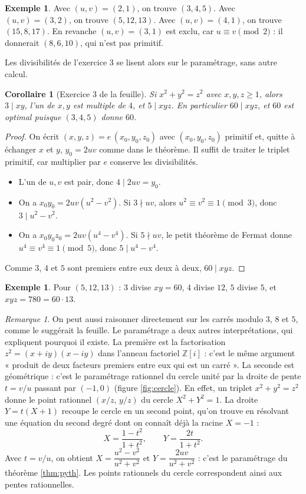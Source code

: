 \documentclass[11pt,a4paper]{article}
\theoremstyle{plain}
\newtheorem{corollaire}[theoreme]{Corollaire}
\theoremstyle{definition}
\newtheorem{exemple}[theoreme]{Exemple}
\theoremstyle{remark}
\newtheorem{remarque}[theoreme]{Remarque}
\newcommand{\Z}{\mathbb{Z}}
\begin{document}
\begin{exemple}
Avec $(u,v)=(2,1)$, on trouve $(3,4,5)$. Avec $(u,v)=(3,2)$, on trouve $(5,12,13)$. Avec $(u,v)=(4,1)$, on trouve $(15,8,17)$. En revanche $(u,v)=(3,1)$ est exclu, car $u\equiv v\pmod 2$ : il donnerait $(8,6,10)$, qui n'est pas primitif.
\end{exemple}

Les divisibilités de l'exercice 3 se lisent alors sur le paramétrage, sans autre calcul.

\begin{corollaire}[Exercice 3 de la feuille]\label{cor:60}
Si $x^2+y^2=z^2$ avec $x,y,z\geq1$, alors $3\mid xy$, l'un de $x,y$ est multiple de $4$, et $5\mid xyz$. En particulier $60\mid xyz$, et $60$ est optimal puisque $(3,4,5)$ donne $60$.
\end{corollaire}

\begin{proof}
On écrit $(x,y,z)=e\,(x_0,y_0,z_0)$ avec $(x_0,y_0,z_0)$ primitif et, quitte à échanger $x$ et $y$, $y_0=2uv$ comme dans le théorème. Il suffit de traiter le triplet primitif, car multiplier par $e$ conserve les divisibilités.
\begin{itemize}[nosep]
\item L'un de $u,v$ est pair, donc $4\mid 2uv=y_0$.
\item On a $x_0y_0=2uv(u^2-v^2)$. Si $3\nmid uv$, alors $u^2\equiv v^2\equiv1\pmod3$, donc $3\mid u^2-v^2$.
\item On a $x_0y_0z_0=2uv(u^4-v^4)$. Si $5\nmid uv$, le petit théorème de Fermat donne $u^4\equiv v^4\equiv1\pmod5$, donc $5\mid u^4-v^4$.
\end{itemize}
Comme $3$, $4$ et $5$ sont premiers entre eux deux à deux, $60\mid xyz$.
\end{proof}

\begin{exemple}
Pour $(5,12,13)$ : $3$ divise $xy=60$, $4$ divise $12$, $5$ divise $5$, et $xyz=780=60\cdot13$.
\end{exemple}

\begin{remarque}
On peut aussi raisonner directement sur les carrés modulo $3$, $8$ et $5$, comme le suggérait la feuille. Le paramétrage a deux autres interprétations, qui expliquent pourquoi il existe. La première est la factorisation $z^2=(x+iy)(x-iy)$ dans l'anneau factoriel $\Z[i]$ : c'est le même argument « produit de deux facteurs premiers entre eux qui est un carré ». La seconde est géométrique : c'est le paramétrage rationnel du cercle unité par la droite de pente $t=v/u$ passant par $(-1,0)$ (figure \ref{fig:cercle}). En effet, un triplet $x^2+y^2=z^2$ donne le point rationnel $(x/z,\,y/z)$ du cercle $X^2+Y^2=1$. La droite $Y=t(X+1)$ recoupe le cercle en un second point, qu'on trouve en résolvant une équation du second degré dont on connaît déjà la racine $X=-1$ :
\[
  X=\frac{1-t^2}{1+t^2},\qquad Y=\frac{2t}{1+t^2}.
\]
Avec $t=v/u$, on obtient $X=\dfrac{u^2-v^2}{u^2+v^2}$ et $Y=\dfrac{2uv}{u^2+v^2}$ : c'est le paramétrage du théorème \ref{thm:pyth}. Les points rationnels du cercle correspondent ainsi aux pentes rationnelles.
\end{remarque}
\end{document}
